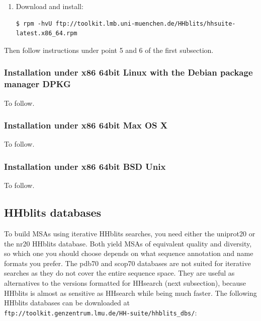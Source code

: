 \documentclass[11pt,a4paper]{article}
\begin{document}
\begin{enumerate}
\item Download and install:
\begin{verbatim}
$ rpm -hvU ftp://toolkit.lmb.uni-muenchen.de/HHblits/hhsuite-latest.x86_64.rpm
\end{verbatim}
\end{enumerate}

Then follow instructions under point 5 and 6 of the first subsection.

\subsubsection*{Installation under x86 64bit Linux with the Debian package manager DPKG}

To follow.


\subsubsection*{Installation under x86 64bit Max OS X}

To follow.


\subsubsection*{Installation under x86 64bit BSD Unix}

To follow.



\subsection{HHblits databases} \label{hhblits_dbs}
To build MSAs using iterative HHblits searches, you need either the uniprot20 or the nr20 HHblits database. Both yield MSAs of equivalent quality and diversity, so which one you should choose depends on what sequence annotation and name formats you prefer. The pdb70 and scop70 databases are not suited for iterative searches as they do not cover the entire sequence space. They are useful as alternatives to the versions formatted for HHsearch (next subsection), because HHblits is almost as sensitive as HHsearch while being much faster. The following HHblits databases can be downloaded at 
\verb`ftp://toolkit.genzentrum.lmu.de/HH-suite/hhblits_dbs/`: 
\end{document}
